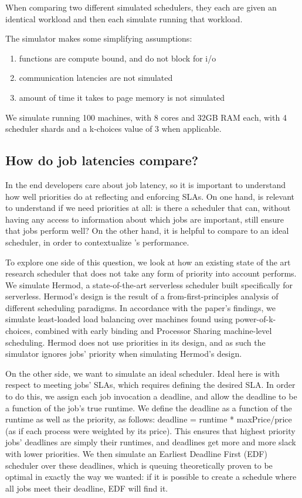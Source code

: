 When comparing two different simulated schedulers, they each are given an
identical workload and then each simulate running that workload.

The simulator makes some simplifying assumptions:
\begin{enumerate}
    \item functions are compute bound, and do not block for i/o
    \item communication latencies are not simulated
    \item amount of time it takes to page memory is not simulated
\end{enumerate}

We simulate running 100 machines, with 8 cores and 32GB RAM each, with 4
scheduler shards and a k-choices value of 3 when applicable.

\subsection{How do job latencies compare?}

In the end developers care about job latency, so it is important to understand
how well priorities do at reflecting and enforcing SLAs. On one hand, is
relevant to understand if we need priorities at all: is there a scheduler that
can, without having any access to information about which jobs are important,
still ensure that jobs perform well? On the other hand, it is helpful to compare
\sys{} to an ideal scheduler, in order to contextualize \sys{}'s performance.

To explore one side of this question, we look at how an existing state of the
art research scheduler that does not take any form of priority into account
performs. We simulate Hermod\cite{TODO}, a state-of-the-art serverless scheduler
built specifically for serverless. Hermod's design is the result of a
from-first-principles analysis of different scheduling paradigms. In accordance
with the paper's findings, we simulate least-loaded load balancing over machines
found using power-of-k-choices, combined with early binding and Processor
Sharing machine-level scheduling. Hermod does not use priorities in its design,
and as such the simulator ignores jobs' priority when simulating Hermod's
design.


On the other side, we want to simulate an ideal scheduler. Ideal here is with
respect to meeting jobs' SLAs, which requires defining the desired SLA. In order
to do this, we assign each job invocation a deadline, and allow the deadline to
be a function of the job's true runtime. We define the deadline as a function of
the runtime as well as the priority, as follows: deadline = runtime *
maxPrice/price (as if each process were weighted by its price). This ensures
that highest priority jobs' deadlines are simply their runtimes, and deadlines
get more and more slack with lower priorities. We then simulate an Earliest
Deadline First (EDF) scheduler over these deadlines, which is queuing
theoretically proven to be optimal in exactly the way we wanted: if it is
possible to create a schedule where all jobs meet their deadline, EDF will find
it\cite{TODO}.

